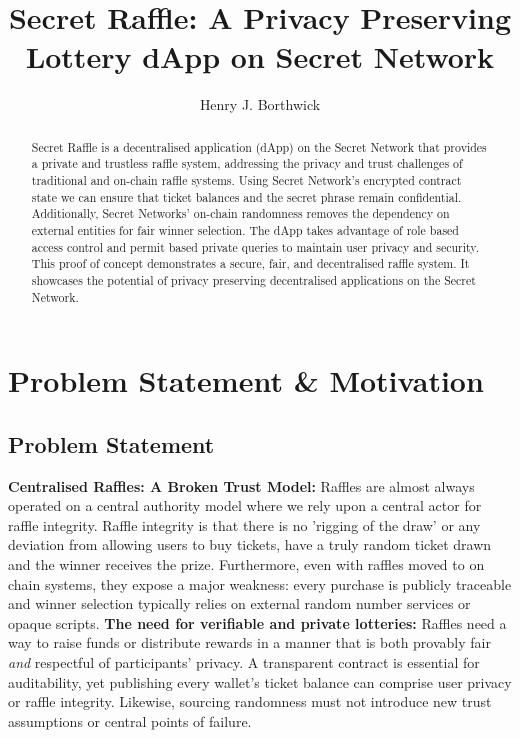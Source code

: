 \documentclass[8pt]{extarticle}
\title{Secret Raffle: A Privacy Preserving Lottery dApp on Secret Network}
\author{Henry J. Borthwick}
\begin{document}
\maketitle

\begin{abstract}
Secret Raffle is a decentralised application (dApp) on the Secret Network that provides a private and trustless raffle system, addressing the privacy and trust challenges of traditional and on-chain raffle systems. Using Secret Network's encrypted contract state we can ensure that ticket balances and the secret phrase remain confidential. Additionally, Secret Networks' on-chain randomness removes the dependency on external entities for fair winner selection. The dApp takes advantage of role based access control and permit based private queries to maintain user privacy and security. This proof of concept demonstrates a secure, fair, and decentralised raffle system. It showcases the potential of privacy preserving decentralised applications on the Secret Network.
\end{abstract}

\section{Problem Statement \& Motivation}
\subsection{Problem Statement}
\textbf{Centralised Raffles: A Broken Trust Model:} Raffles are almost always operated on a central authority model where we rely upon a central actor for raffle integrity. Raffle integrity is that there is no 'rigging of the draw' or any deviation from allowing users to buy tickets, have a truly random ticket drawn and the winner receives the prize. Furthermore, even with raffles moved to on chain systems, they expose a major weakness: every purchase is publicly traceable and winner selection typically relies on external random number services or opaque scripts. \textbf{The need for verifiable and private lotteries:} Raffles need a way to raise funds or distribute rewards in a manner that is both provably fair \emph{and} respectful of participants' privacy. A transparent contract is essential for auditability, yet publishing every wallet's ticket balance can comprise user privacy or raffle integrity. Likewise, sourcing randomness must not introduce new trust assumptions or central points of failure.
\end{document}
